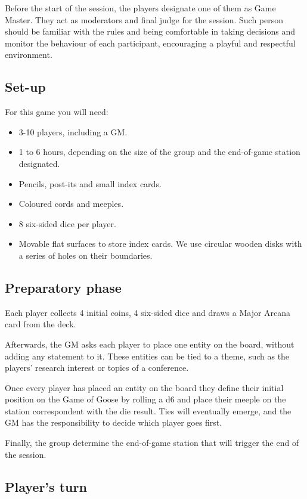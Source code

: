 \documentclass{article}
\begin{document}
\begin{multicols}{2}
Before the start of the session, the players designate one of them as Game Master. They act as moderators and final judge for the session. Such person should be familiar with the rules and being comfortable in taking decisions and monitor the behaviour of each participant, encouraging a playful and respectful environment.

\subsection{Set-up}

For this game you will need:

\begin{itemize}
\item 3-10 players, including a GM.
\item 1 to 6 hours, depending on the size of the group and the end-of-game station designated.
\item Pencils, post-its and small index cards.
\item Coloured cords and meeples.
\item 8 six-sided dice per player.
\item Movable flat surfaces to store index cards. We use circular wooden disks with a series of holes on their boundaries.
\end{itemize}

\subsection{Preparatory phase}

Each player collects 4 initial coins, 4 six-sided dice and draws a Major Arcana card from the deck.

Afterwards, the GM asks each player to place one entity on the board, without adding any statement to it. These entities can be tied to a theme, such as the players' research interest or topics of a conference.

Once every player has placed an entity on the board they define their initial position on the Game of Goose by rolling a d6 and place their meeple on the station correspondent with the die result. Ties will eventually emerge, and the GM has the responsibility to decide which player goes first.

Finally, the group determine the end-of-game station that will trigger the end of the session.

\subsection{Player's turn}


\end{multicols}
\end{document}
